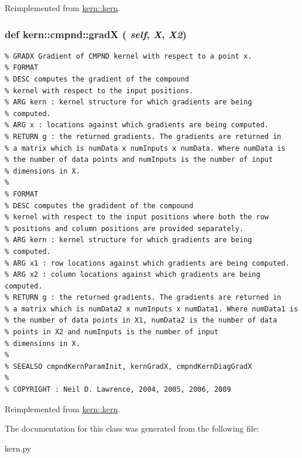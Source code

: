 Reimplemented from \hyperlink{classkern_1_1kern}{kern::kern}.\hypertarget{classkern_1_1cmpnd_ae07d88bf593fd048c2a0464bfd923b8}{
\subsubsection[{gradX}]{\setlength{\rightskip}{0pt plus 5cm}def kern::cmpnd::gradX ( {\em self}, \/   {\em X}, \/   {\em X2})}}
\label{classkern_1_1cmpnd_ae07d88bf593fd048c2a0464bfd923b8}




\footnotesize\begin{verbatim}% GRADX Gradient of CMPND kernel with respect to a point x.
% FORMAT
% DESC computes the gradient of the compound
% kernel with respect to the input positions. 
% ARG kern : kernel structure for which gradients are being
% computed.
% ARG x : locations against which gradients are being computed.
% RETURN g : the returned gradients. The gradients are returned in
% a matrix which is numData x numInputs x numData. Where numData is
% the number of data points and numInputs is the number of input
% dimensions in X.
%
% FORMAT
% DESC computes the gradident of the compound
% kernel with respect to the input positions where both the row
% positions and column positions are provided separately.
% ARG kern : kernel structure for which gradients are being
% computed.
% ARG x1 : row locations against which gradients are being computed.
% ARG x2 : column locations against which gradients are being computed.
% RETURN g : the returned gradients. The gradients are returned in
% a matrix which is numData2 x numInputs x numData1. Where numData1 is
% the number of data points in X1, numData2 is the number of data
% points in X2 and numInputs is the number of input
% dimensions in X.
%
% SEEALSO cmpndKernParamInit, kernGradX, cmpndKernDiagGradX
%
% COPYRIGHT : Neil D. Lawrence, 2004, 2005, 2006, 2009

\end{verbatim}
\normalsize
 

Reimplemented from \hyperlink{classkern_1_1kern}{kern::kern}.

The documentation for this class was generated from the following file:\begin{CompactItemize}
\item 
kern.py\end{CompactItemize}
